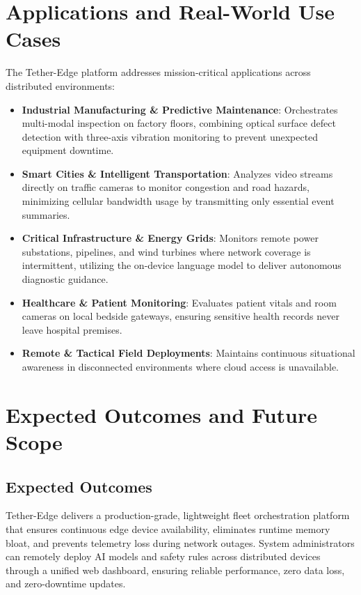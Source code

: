 \documentclass[conference]{IEEEtran}
\begin{document}
    \section{Applications and Real-World Use Cases}
    The Tether-Edge platform addresses mission-critical applications across distributed environments:
    \begin{itemize}
        \item \textbf{Industrial Manufacturing \& Predictive Maintenance}: Orchestrates multi-modal inspection on factory floors, combining optical surface defect
        detection with three-axis vibration monitoring to prevent unexpected equipment downtime.
        \item \textbf{Smart Cities \& Intelligent Transportation}: Analyzes video streams directly on traffic cameras to monitor congestion and road hazards,
        minimizing cellular bandwidth usage by transmitting only essential event summaries.
        \item \textbf{Critical Infrastructure \& Energy Grids}: Monitors remote power substations, pipelines, and wind turbines where network coverage is
        intermittent, utilizing the on-device language model to deliver autonomous diagnostic guidance.
        \item \textbf{Healthcare \& Patient Monitoring}: Evaluates patient vitals and room cameras on local bedside gateways, ensuring sensitive health records
        never leave hospital premises.
        \item \textbf{Remote \& Tactical Field Deployments}: Maintains continuous situational awareness in disconnected environments where cloud access is
        unavailable.
    \end{itemize}
    
    \section{Expected Outcomes and Future Scope}
    
    \subsection{Expected Outcomes}
    Tether-Edge delivers a production-grade, lightweight fleet orchestration platform that ensures continuous edge device availability, eliminates runtime memory
    bloat, and prevents telemetry loss during network outages. System administrators can remotely deploy AI models and safety rules across distributed devices
    through a unified web dashboard, ensuring reliable performance, zero data loss, and zero-downtime updates.
    
\end{document}
